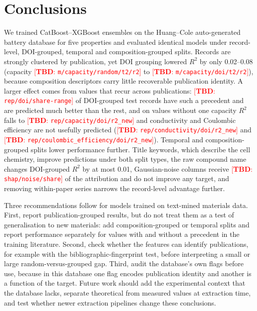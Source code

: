 \documentclass[journal=jcisd8,manuscript=article,layout=traditional]{achemso}
\newcommand{\TBD}[1]{\textcolor{red}{[\textbf{TBD}: \nolinkurl{#1}]}}
\begin{document}
\section{Conclusions}
\label{sec:conclusion}

We trained CatBoost--XGBoost ensembles on the Huang--Cole auto-generated battery database for five properties and evaluated identical models under record-level, DOI-grouped, temporal and composition-grouped splits. Records are strongly clustered by publication, yet DOI grouping lowered $R^2$ by only 0.02--0.08 (capacity \TBD{m/capacity/random/t2/r2} to \TBD{m/capacity/doi/t2/r2}), because composition descriptors carry little recoverable publication identity. A larger effect comes from values that recur across publications: \TBD{rep/doi/share-range} of DOI-grouped test records have such a precedent and are predicted much better than the rest, and on values without one capacity $R^2$ falls to \TBD{rep/capacity/doi/r2_new} and conductivity and Coulombic efficiency are not usefully predicted (\TBD{rep/conductivity/doi/r2_new} and \TBD{rep/coulombic_efficiency/doi/r2_new}). Temporal and composition-grouped splits lower performance further. Title keywords, which describe the cell chemistry, improve predictions under both split types, the raw compound name changes DOI-grouped $R^2$ by at most 0.01, Gaussian-noise columns receive \TBD{shap/noise/share} of the attribution and do not improve any target, and removing within-paper series narrows the record-level advantage further.

Three recommendations follow for models trained on text-mined materials data. First, report publication-grouped results, but do not treat them as a test of generalisation to new materials: add composition-grouped or temporal splits and report performance separately for values with and without a precedent in the training literature. Second, check whether the features can identify publications, for example with the bibliographic-fingerprint test, before interpreting a small or large random-versus-grouped gap. Third, audit the database's own flags before use, because in this database one flag encodes publication identity and another is a function of the target. Future work should add the experimental context that the database lacks, separate theoretical from measured values at extraction time, and test whether newer extraction pipelines \cite{huang2022batterybert,dagdelen2024structured} change these conclusions.
\end{document}
